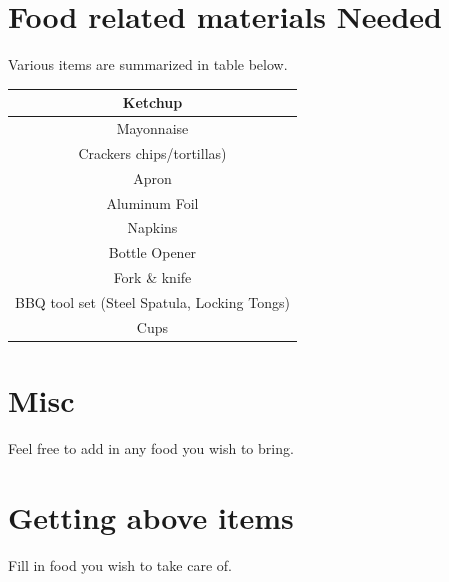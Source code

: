 \documentclass[12pt]{article}
\begin{document}
\section*{Food related materials Needed}
	Various items are summarized in table below.
	\begin{center}

		\begin{tabular}{|c|}
			\hline
			                  Ketchup                   \\ \hline
			                Mayonnaise                  \\ \hline
			        Crackers  chips/tortillas)          \\ \hline
			                   Apron                    \\ \hline
			               Aluminum Foil                \\ \hline
			                  Napkins                   \\ \hline
			               Bottle Opener                \\ \hline
			               Fork \& knife                \\ \hline
			BBQ tool set (Steel Spatula, Locking Tongs) \\ \hline
			                   Cups                     \\ \hline
		\end{tabular} 
		\end{center}
	

\section*{Misc}
	

	Feel free to add in any food you wish to bring.

\section*{Getting above items}
	Fill in food you wish to take care of. 
	
\end{document}
